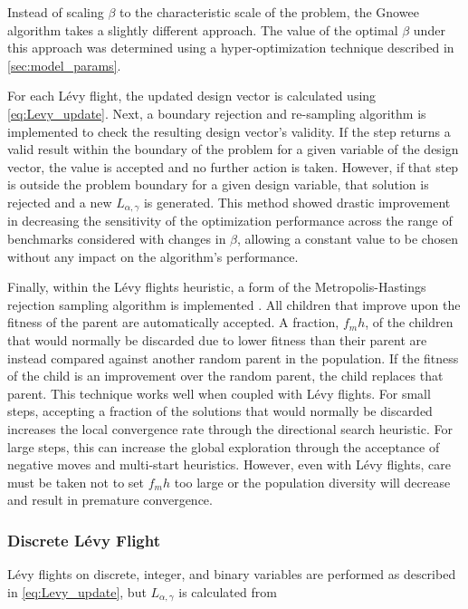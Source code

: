 \documentclass{article}                                                                           %
\begin{document}
Instead of scaling $\beta$ to the characteristic scale of the problem, the Gnowee algorithm takes a slightly different approach.
The value of the optimal $\beta$ under this approach was determined using a hyper-optimization technique described in \autoref{sec:model_params}.

For each Lévy flight, the updated design vector is calculated using \autoref{eq:Levy_update}. 
Next, a boundary rejection and re-sampling algorithm is implemented to check the resulting design vector's validity. 
If the step returns a valid result within the boundary of the problem for a given variable of the design vector, the value is accepted and no further action is taken.
However, if that step is outside the problem boundary for a given design variable, that solution is rejected and a new $L_{\alpha,\gamma}$ is generated.  
This method showed drastic improvement in decreasing the sensitivity of the optimization performance across the range of benchmarks considered with changes in $\beta$, allowing a constant value to be chosen without any impact on the algorithm's performance. 

Finally, within the Lévy flights heuristic, a form of the Metropolis-Hastings rejection sampling algorithm is implemented \cite{Hastings1970}.  
All children that improve upon the fitness of the parent are automatically accepted.
A fraction, $f_mh$, of the children that would normally be discarded due to lower fitness than their parent are instead compared against another random parent in the population.
If the fitness of the child is an improvement over the random parent, the child replaces that parent.
This technique works well when coupled with Lévy flights.
For small steps, accepting a fraction of the solutions that would normally be discarded increases the local convergence rate through the directional search heuristic.
For large steps, this can increase the global exploration through the acceptance of negative moves and multi-start heuristics.  
However, even with Lévy flights, care must be taken not to set $f_mh$ too large or the population diversity will decrease and result in premature convergence.   

\subsubsection{Discrete Lévy Flight}  \label{sec:discrete-levy}
Lévy flights on discrete, integer, and binary variables are performed as described in \autoref{eq:Levy_update}, but $L_{\alpha,\gamma}$ is calculated from
\end{document}
